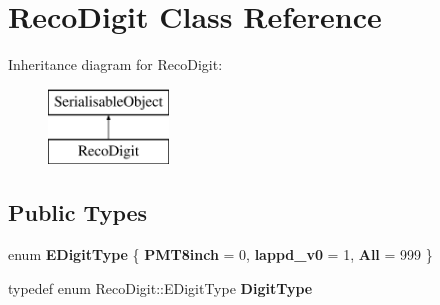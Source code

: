 \hypertarget{classRecoDigit}{\section{Reco\-Digit Class Reference}
\label{classRecoDigit}
}
Inheritance diagram for Reco\-Digit\-:\begin{figure}[H]
\begin{center}
\leavevmode
\includegraphics[height=2.000000cm]{classRecoDigit}
\end{center}
\end{figure}
\subsection*{Public Types}
\begin{DoxyCompactItemize}
\item 
enum {\bfseries E\-Digit\-Type} \{ {\bfseries P\-M\-T8inch} = 0, 
{\bfseries lappd\-\_\-v0} = 1, 
{\bfseries All} = 999
 \}
\item 
\hypertarget{classRecoDigit_a956555c09334bd9113b3928a64a24e78}{typedef enum Reco\-Digit\-::\-E\-Digit\-Type {\bfseries Digit\-Type}}\label{classRecoDigit_a956555c09334bd9113b3928a64a24e78}

\end{DoxyCompactItemize}
